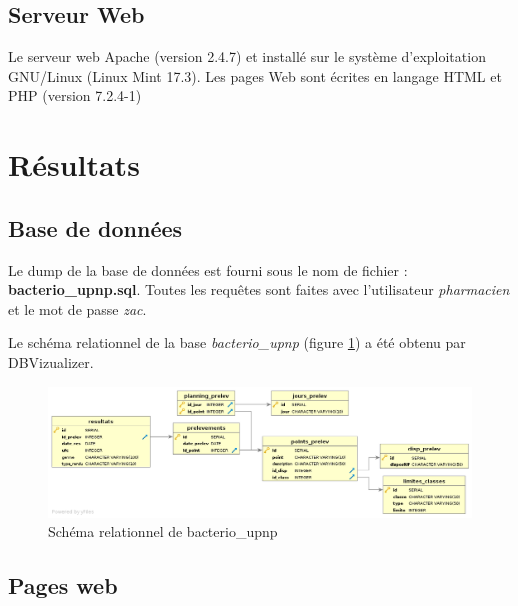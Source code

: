 \documentclass[12pt,a4paper,oneside]{article}
\begin{document}
\subsection{Serveur Web}
Le serveur web Apache (version 2.4.7) et installé sur le système d'exploitation GNU/Linux (Linux Mint 17.3).
Les pages Web sont écrites en langage HTML et PHP (version 7.2.4-1)
\section{Résultats}
\subsection{Base de données}
Le dump de la base de données est fourni sous le nom de fichier : \textbf{bacterio\_upnp.sql}. Toutes les requêtes sont faites avec l'utilisateur \emph{pharmacien} et le mot de passe \emph{zac}.

Le schéma relationnel de la base \emph{bacterio\_upnp} (figure \ref{erd}) a été obtenu par DBVizualizer.
\begin{figure}
\caption{\label{erd}Schéma relationnel de bacterio\_upnp}
\includegraphics[scale=0.4]{erd.png}
\end{figure}

\subsection{Pages web}
\end{document}
